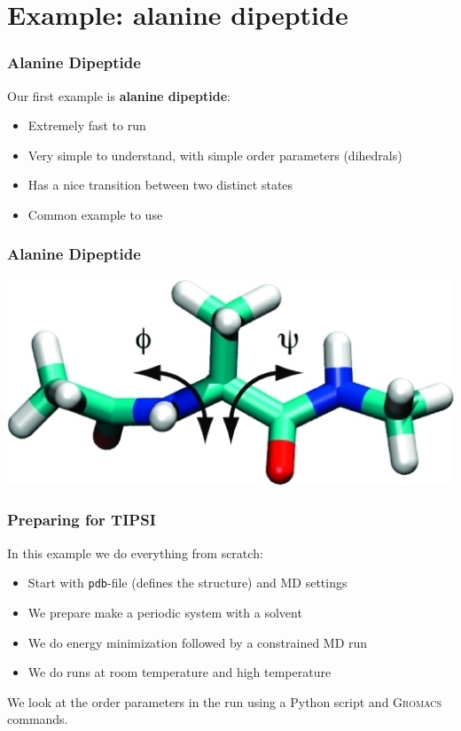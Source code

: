 \documentclass[hyperref={pdfpagelabels=false}]{beamer}
\begin{document}
\section{Example: alanine dipeptide} 
\setcounter{subsection}{1}

\begin{frame}
\frametitle{Alanine Dipeptide} 
Our first example is \textbf{alanine dipeptide}:
\begin{itemize}
\item Extremely fast to run
\item Very simple to understand, with simple order parameters (dihedrals)
\item Has a nice transition between two distinct states
\item Common example to use
\end{itemize}
\end{frame}

\begin{frame}
\frametitle{Alanine Dipeptide} 
\begin{center}
\includegraphics[scale=0.4]{images/alanine.png}
\end{center}
\end{frame}

\begin{frame}
\frametitle{Preparing for \textsc{TIPSI}} 
In this example we do everything from scratch:
\begin{itemize}
\item Start with \texttt{pdb}-file (defines the structure) and MD settings
\item We prepare make a periodic system with a solvent
\item We do energy minimization followed by a constrained MD run
\item We do runs at room temperature and high temperature
\end{itemize}
We look at the order parameters in the run using a Python script and \textsc{Gromacs} commands.
\end{frame}
\end{document}
